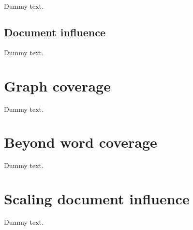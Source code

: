 Dummy text.

\subsection{Document influence}

Dummy text.

\section{Graph coverage}

Dummy text.

\section{Beyond word coverage}

Dummy text.

\section{Scaling document influence}

Dummy text.

